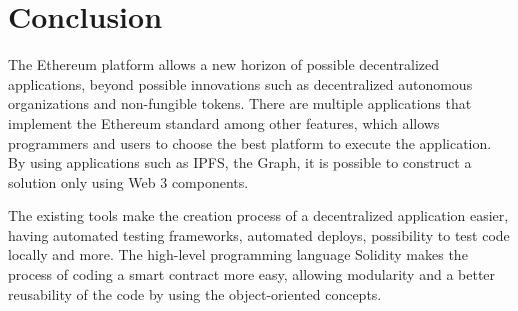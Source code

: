 \documentclass[
    article, 
    12pt,				%
	oneside,			%
	a4paper,			%
	chapter=TITLE,		%
	section=TITLE,		%
	english,			%
	english,				%
	sumario=tradicional
]{abntex2}
\begin{document}
\section{Conclusion}

The Ethereum platform allows a new horizon of possible decentralized applications, beyond possible innovations such as decentralized autonomous organizations and non-fungible tokens.
There are multiple applications that implement the Ethereum standard among other features, which allows programmers and users to choose the best platform to execute the application.
By using applications such as IPFS, the Graph, it is possible to construct a solution only using Web 3 components.

The existing tools make the creation process of a decentralized application easier, having automated testing frameworks, automated deploys, possibility to test code locally and more.
The high-level programming language Solidity makes the process of coding a smart contract more easy, allowing modularity and a better reusability of the code by using the object-oriented concepts.



\end{document}
